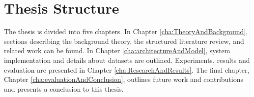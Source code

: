 \section{Thesis Structure}
\label{sec:thesisStructure}
The thesis is divided into five chapters. In Chapter \ref{cha:TheoryAndBackground}, sections describing the background theory, the structured literature review, and related work can be found. In Chapter \ref{cha:architectureAndModel}, system implementation and details about datasets are outlined. Experiments, results and evaluation are presented in Chapter \ref{cha:ResearchAndResults}. The final chapter, Chapter \ref{cha:evaluationAndConclusion}, outlines future work and contributions and presents a conclusion to this thesis.